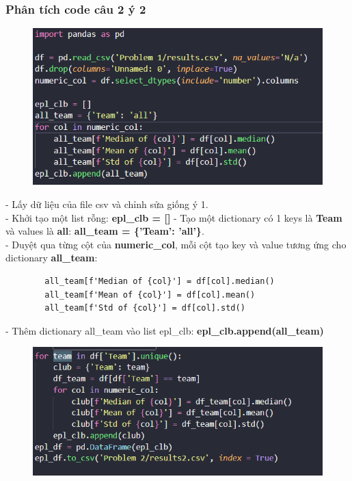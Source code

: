 \subsubsection{Phân tích code câu 2 ý 2}
    \begin{figure}[H]
        \centering
        \includegraphics[width=1\linewidth]{img/2_2-1.png}
    \end{figure}
    - Lấy dữ liệu của file csv và chỉnh sửa giống ý 1.\\
    - Khởi tạo một list rỗng: \textbf{epl\_clb = []}
    - Tạo một dictionary có 1 keys là \textbf{Team} và values là \textbf{all}: \textbf{all\_team = \{'Team': 'all'\}}.\\
    - Duyệt qua từng cột của \textbf{numeric\_col}, mỗi cột tạo key và value tương ứng cho dictionary \textbf{all\_team}: \begin{verbatim}
        all_team[f'Median of {col}'] = df[col].median()
        all_team[f'Mean of {col}'] = df[col].mean()
        all_team[f'Std of {col}'] = df[col].std()
    \end{verbatim}
    - Thêm dictionary all\_team vào list epl\_clb: \textbf{epl\_clb.append(all\_team)}
    \begin{figure}[H]
        \centering
        \includegraphics[width=1\linewidth]{img/2_2-2.png}
    \end{figure}

